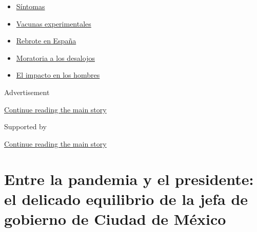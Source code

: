 \begin{itemize}
\tightlist
\item
  \href{https://www.nytimes3xbfgragh.onion/es/interactive/2020/08/06/espanol/ciencia-y-tecnologia/tengo-covid-19-sintomas.html?name=styln-coronavirus-es\&region=TOP_BANNER\&block=storyline_menu_recirc\&action=click\&pgtype=Article\&impression_id=aa593d50-f2bc-11ea-a620-0defd8f835ac\&variant=undefined}{Síntomas}
\item
  \href{https://www.nytimes3xbfgragh.onion/es/2020/09/02/espanol/ciencia-y-tecnologia/vacunas-experimentales-coronavirus.html?name=styln-coronavirus-es\&region=TOP_BANNER\&block=storyline_menu_recirc\&action=click\&pgtype=Article\&impression_id=aa593d51-f2bc-11ea-a620-0defd8f835ac\&variant=undefined}{Vacunas
  experimentales}
\item
  \href{https://www.nytimes3xbfgragh.onion/es/2020/08/31/espanol/mundo/rebrote-espana.html?name=styln-coronavirus-es\&region=TOP_BANNER\&block=storyline_menu_recirc\&action=click\&pgtype=Article\&impression_id=aa593d52-f2bc-11ea-a620-0defd8f835ac\&variant=undefined}{Rebrote
  en España}
\item
  \href{https://www.nytimes3xbfgragh.onion/es/2020/09/02/espanol/negocios/desalojos-trump.html?name=styln-coronavirus-es\&region=TOP_BANNER\&block=storyline_menu_recirc\&action=click\&pgtype=Article\&impression_id=aa593d53-f2bc-11ea-a620-0defd8f835ac\&variant=undefined}{Moratoria
  a los desalojos}
\item
  \href{https://www.nytimes3xbfgragh.onion/es/2020/08/26/espanol/ciencia-y-tecnologia/coronavirus-afecta-hombres.html?name=styln-coronavirus-es\&region=TOP_BANNER\&block=storyline_menu_recirc\&action=click\&pgtype=Article\&impression_id=aa593d54-f2bc-11ea-a620-0defd8f835ac\&variant=undefined}{El
  impacto en los hombres}
\end{itemize}

Advertisement

\protect\hyperlink{after-top}{Continue reading the main story}

Supported by

\protect\hyperlink{after-sponsor}{Continue reading the main story}

\hypertarget{entre-la-pandemia-y-el-presidente-el-delicado-equilibrio-de-la-jefa-de-gobierno-de-ciudad-de-muxe9xico}{%
\section{Entre la pandemia y el presidente: el delicado equilibrio de la
jefa de gobierno de Ciudad de
México}\label{entre-la-pandemia-y-el-presidente-el-delicado-equilibrio-de-la-jefa-de-gobierno-de-ciudad-de-muxe9xico}}

